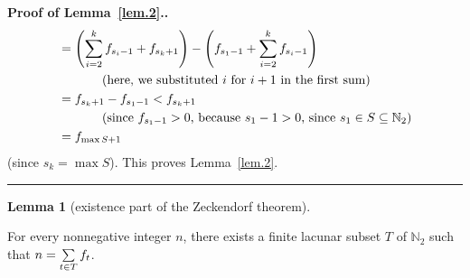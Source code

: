 \documentclass[numbers=enddot,12pt,final,onecolumn,notitlepage]{scrartcl}%
\numberwithin{exer}{section}
\theoremstyle{definition}
\newtheorem{lem}[theo]{Lemma}
\newenvironment{lemma}[1][]
{\begin{lem}[#1]\begin{leftbar}}
{\end{leftbar}\end{lem}}
\newenvironment{proof}[1][Proof]{\noindent\textbf{#1.} }{\ \rule{0.5em}{0.5em}}
\let\sumnonlimits\sum
\renewcommand{\sum}{\sumnonlimits\limits}
\begin{document}
\begin{proof}[Proof of Lemma~\ref{lem.2}.]
\begin{align*}
&  =\left(  \sum\limits_{i=2}^{k}f_{s_{i}-1}+f_{s_{k}+1}\right)  -\left(
f_{s_{1}-1}+\sum\limits_{i=2}^{k}f_{s_{i}-1}\right) \\
&  \ \ \ \ \ \ \ \ \ \ \left(  \text{here, we substituted }i\text{ for
}i+1\text{ in the first sum}\right) \\
&  =f_{s_{k}+1}-f_{s_{1}-1}<f_{s_{k}+1}\\
&  \ \ \ \ \ \ \ \ \ \ \left(  \text{since }f_{s_{1}-1}>0\text{, because
}s_{1}-1>0\text{, since }s_{1}\in S\subseteq\mathbb{N}_{2}\right) \\
&  =f_{\max S+1}%
\end{align*}
(since $s_{k}=\max S$). This proves Lemma~\ref{lem.2}.
\end{proof}

\begin{lemma}[existence part of the Zeckendorf theorem] \label{lem.3}
For every
nonnegative integer $n$, there exists a finite lacunar subset $T$ of
$\mathbb{N}_{2}$ such that $n=\sum\limits_{t\in T}f_{t}$.
\end{lemma}
\end{document}
